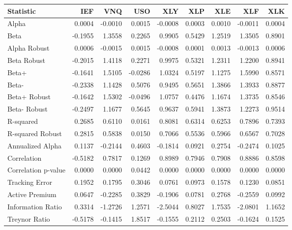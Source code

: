 \begin{tabular}{lrrrrrrrr}
\toprule
Statistic & IEF & VNQ & USO & XLY & XLP & XLE & XLF & XLK \\
\midrule
Alpha & 0.0004 & -0.0010 & 0.0015 & -0.0008 & 0.0003 & 0.0010 & -0.0011 & 0.0004 \\
Beta & -0.1955 & 1.3558 & 0.2265 & 0.9905 & 0.5429 & 1.2519 & 1.3505 & 0.8901 \\
Alpha Robust & 0.0006 & -0.0015 & 0.0015 & -0.0008 & 0.0001 & 0.0013 & -0.0013 & 0.0006 \\
Beta Robust & -0.2015 & 1.4118 & 0.2271 & 0.9975 & 0.5321 & 1.2311 & 1.2200 & 0.8941 \\
Beta+ & -0.1641 & 1.5105 & -0.0286 & 1.0324 & 0.5197 & 1.1275 & 1.5990 & 0.8571 \\
Beta- & -0.2338 & 1.1428 & 0.5076 & 0.9495 & 0.5651 & 1.3866 & 1.3933 & 0.8877 \\
Beta+ Robust & -0.1642 & 1.5302 & -0.0496 & 1.0757 & 0.4476 & 1.1674 & 1.3735 & 0.8546 \\
Beta- Robust & -0.2497 & 1.1677 & 0.5645 & 0.9637 & 0.5941 & 1.3873 & 1.2273 & 0.9514 \\
R-squared & 0.2685 & 0.6110 & 0.0161 & 0.8081 & 0.6314 & 0.6253 & 0.7896 & 0.7393 \\
R-squared Robust & 0.2815 & 0.5838 & 0.0150 & 0.7066 & 0.5536 & 0.5966 & 0.6567 & 0.7028 \\
Annualized Alpha & 0.1137 & -0.2144 & 0.4603 & -0.1814 & 0.0921 & 0.2754 & -0.2474 & 0.1025 \\
Correlation & -0.5182 & 0.7817 & 0.1269 & 0.8989 & 0.7946 & 0.7908 & 0.8886 & 0.8598 \\
Correlation p-value & 0.0000 & 0.0000 & 0.0442 & 0.0000 & 0.0000 & 0.0000 & 0.0000 & 0.0000 \\
Tracking Error & 0.1952 & 0.1795 & 0.3046 & 0.0761 & 0.0973 & 0.1578 & 0.1230 & 0.0851 \\
Active Premium & 0.0647 & -0.2285 & 0.3829 & -0.1906 & 0.0781 & 0.2768 & -0.2559 & 0.0992 \\
Information Ratio & 0.3314 & -1.2726 & 1.2571 & -2.5044 & 0.8027 & 1.7535 & -2.0801 & 1.1652 \\
Treynor Ratio & -0.5178 & -0.1415 & 1.8517 & -0.1555 & 0.2112 & 0.2503 & -0.1624 & 0.1525 \\
\bottomrule
\end{tabular}
